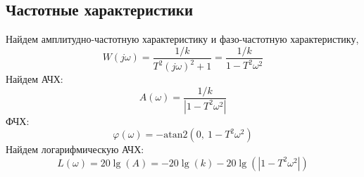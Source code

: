 \subsection{Частотные характеристики}
\noindent Найдем амплитудно-частотную характеристику и фазо-частотную характеристику,
\begin{equation}
    W(j\omega) = \frac{1/k}{T^2(j\omega)^2 + 1} = \frac{1/k}{1 - T^2\omega^2}
\end{equation}
Найдем АЧХ:
\begin{equation}
    A(\omega) = \frac{1/k}{|1 - T^2\omega^2|}
\end{equation}
ФЧХ:
\begin{equation}
    \varphi(\omega) = -\text{atan2}\left(0,~1 - T^2\omega^2\right)
\end{equation}
Найдем логарифмическую АЧХ: 
\begin{equation}
    L(\omega) = 20\lg(A) = -20\lg(k) - 20\lg(|1 - T^2\omega^2|)
\end{equation}

